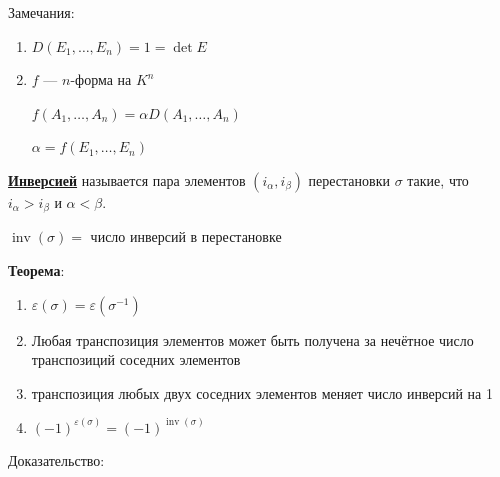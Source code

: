 \documentclass[twoside]{book}
\DeclareMathOperator{\inv}{inv}
\begin{document}
Замечания:
\begin{enumerate}
    \item \(D(E_1, \ldots, E_n) = 1 = \det E\)
    \item \(f\) --- \(n\)-форма на \(K^n\)

          \(f(A_1, \ldots, A_n) = \alpha D(A_1, \ldots, A_n)\)

          \(\alpha = f(E_1, \ldots, E_n)\)
\end{enumerate}

\uline{\textbf{Инверсией}} называется пара элементов \((i_\alpha,i_\beta) \) перестановки \(\sigma\) такие, что \(i_\alpha> i_\beta\) и \(\alpha<\beta\).

\(\inv(\sigma) = \) число инверсий в перестановке

\textbf{Теорема}:

\begin{enumerate}
    \item \(\varepsilon(\sigma) = \varepsilon(\sigma^{-1})\)
    \item Любая транспозиция элементов может быть получена за нечётное число транспозиций соседних элементов
    \item транспозиция любых двух соседних элементов меняет число инверсий на 1
    \item \((-1)^{\varepsilon(\sigma)}=(-1)^{\inv(\sigma)}\)
\end{enumerate}

Доказательство:
\end{document}
